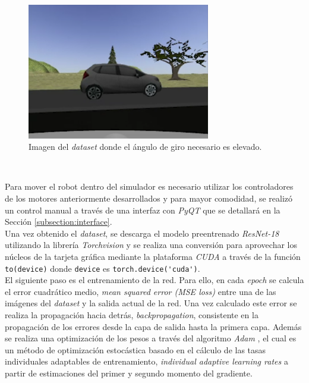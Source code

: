 \begin{figure} [h!]
	\begin{center}
		\includegraphics[width=8cm]{figs/trainedDifficult}
	\end{center}
	\caption{Imagen del \textit{dataset} donde el ángulo de giro necesario es elevado.}
	\label{fig:traineddifficult}
\end{figure}\

Para mover el robot dentro del simulador es necesario utilizar los controladores de los motores anteriormente desarrollados y para mayor comodidad, se realizó un control manual a
través de una interfaz con \textit{PyQT} que se detallará en la Sección \ref{subsection:interface}.\\

Una vez obtenido el \textit{dataset}, se descarga el modelo preentrenado \textit{ResNet-18} utilizando la librería \textit{Torchvision} y se realiza una conversión para aprovechar
los núcleos de la tarjeta gráfica mediante la plataforma \textit{CUDA} a través de la función \verb|to(device)| donde \verb|device| es \verb|torch.device('cuda')|.\\

El siguiente paso es el entrenamiento de la red. Para ello, en cada \textit{epoch} se calcula el error cuadrático medio, \textit{mean squared error (MSE loss)} entre una de las
imágenes del \textit{dataset} y la salida actual de la red. Una vez calculado este error se realiza la propagación hacia detrás, \textit{backpropagation}, consistente en la
propagación de los errores desde la capa de salida hasta la primera capa. Además se realiza una optimización de los pesos a través del algoritmo \textit{Adam} \cite{adam}, el cual
es un método de optimización estocástica basado en el cálculo de las tasas individuales adaptables de entrenamiento, \textit{individual adaptive learning rates} a partir de
estimaciones del primer y segundo momento del gradiente.\\

